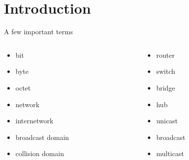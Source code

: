 \section*{Introduction}
\label{sec:introduction}

\begin{frame}{A few important terms}
   \begin{columns}[T]
      \begin{column}{.5\textwidth}
         \begin{itemize}[<+->]
            \item bit
            \item byte
            \item octet
            \item network
            \item internetwork
            \item broadcast domain
            \item collision domain
         \end{itemize}
      \end{column}
      \begin{column}{.5\textwidth}
         \begin{itemize}[<+->]
            \item router
            \item switch
            \item bridge
            \item hub
            \item unicast
            \item broadcast
            \item multicast
         \end{itemize}
      \end{column}
   \end{columns}
\end{frame}



